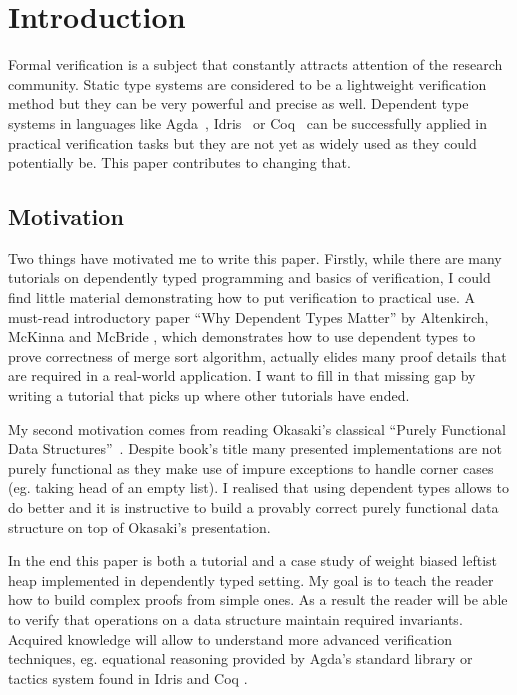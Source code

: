 \section{Introduction}

Formal verification is a subject that constantly attracts attention of the research community. Static type systems are considered to be a lightweight verification method but they can be very powerful and precise as well. Dependent type systems in languages like Agda~\cite{Nor07}, Idris~\cite{Bra13} or Coq~\cite{coq} can be successfully applied in practical verification tasks but they are not yet as widely used as they could potentially be. This paper contributes to changing that.

\subsection{Motivation}

Two things have motivated me to write this paper. Firstly, while there are many tutorials on dependently typed programming and basics of verification, I could find little material demonstrating how to put verification to practical use. A must-read introductory paper ``Why Dependent Types Matter'' by Altenkirch, McKinna and McBride \cite{AltMcBMcK05}, which demonstrates how to use dependent types to prove correctness of merge sort algorithm, actually elides many proof details that are required in a real-world application. I want to fill in that missing gap by writing a tutorial that picks up where other tutorials have ended.

My second motivation comes from reading Okasaki's classical ``Purely Functional Data Structures''~\cite{Oka99}. Despite book's title many presented implementations are not purely functional as they make use of impure exceptions to handle corner cases (eg. taking head of an empty list). I realised that using dependent types allows to do better and it is instructive to build a provably correct purely functional data structure on top of Okasaki's presentation.

In the end this paper is both a tutorial and a case study of weight biased leftist heap implemented in dependently typed setting. My goal is to teach the reader how to build complex proofs from simple ones. As a result the reader will be able to verify that operations on a data structure maintain required invariants. Acquired knowledge will allow to understand more advanced verification techniques, eg. equational reasoning provided by Agda's standard library or tactics system found in Idris \cite{Bra13} and Coq \cite{coq}.

